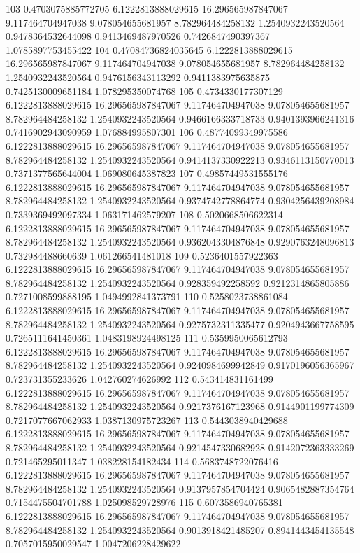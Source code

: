{103 0.4703075885772705 6.1222813888029615 16.296565987847067 9.117464704947038 9.078054655681957 8.782964484258132 1.2540932243520564 0.9478364532644098 0.9413469487970526 0.7426847490397367 1.0785897753455422
104 0.47084736824035645 6.1222813888029615 16.296565987847067 9.117464704947038 9.078054655681957 8.782964484258132 1.2540932243520564 0.9476156343113292 0.9411383975635875 0.7425130009651184 1.078295350074768
105 0.4734330177307129 6.1222813888029615 16.296565987847067 9.117464704947038 9.078054655681957 8.782964484258132 1.2540932243520564 0.9466166333718733 0.9401393966241316 0.7416902943090959 1.076884995807301
106 0.48774099349975586 6.1222813888029615 16.296565987847067 9.117464704947038 9.078054655681957 8.782964484258132 1.2540932243520564 0.9414137330922213 0.9346113150770013 0.7371377565644004 1.069080645387823
107 0.49857449531555176 6.1222813888029615 16.296565987847067 9.117464704947038 9.078054655681957 8.782964484258132 1.2540932243520564 0.9374742778864774 0.9304256439208984 0.7339369492097334 1.063171462579207
108 0.5020668506622314 6.1222813888029615 16.296565987847067 9.117464704947038 9.078054655681957 8.782964484258132 1.2540932243520564 0.9362043304876848 0.9290763248096813 0.732984488660639 1.061266541481018
109 0.5236401557922363 6.1222813888029615 16.296565987847067 9.117464704947038 9.078054655681957 8.782964484258132 1.2540932243520564 0.928359492258592 0.9212314865805886 0.7271008599888195 1.0494992841373791
110 0.5258023738861084 6.1222813888029615 16.296565987847067 9.117464704947038 9.078054655681957 8.782964484258132 1.2540932243520564 0.9275732311335477 0.9204943667758595 0.7265111641450361 1.0483198924498125
111 0.5359950065612793 6.1222813888029615 16.296565987847067 9.117464704947038 9.078054655681957 8.782964484258132 1.2540932243520564 0.9240984699942849 0.9170196056365967 0.723731355233626 1.042760274626992
112 0.543414831161499 6.1222813888029615 16.296565987847067 9.117464704947038 9.078054655681957 8.782964484258132 1.2540932243520564 0.9217376167123968 0.9144901199774309 0.7217077667062933 1.0387130975723267
113 0.5443038940429688 6.1222813888029615 16.296565987847067 9.117464704947038 9.078054655681957 8.782964484258132 1.2540932243520564 0.9214547330682928 0.9142072363333269 0.721465295011347 1.038228154182434
114 0.5683748722076416 6.1222813888029615 16.296565987847067 9.117464704947038 9.078054655681957 8.782964484258132 1.2540932243520564 0.9137957854704424 0.9065482887354764 0.7154475504701788 1.025098529728976
115 0.6073586940765381 6.1222813888029615 16.296565987847067 9.117464704947038 9.078054655681957 8.782964484258132 1.2540932243520564 0.9013918421485207 0.8941443454135548 0.7057015950029547 1.0047206228429622
}
